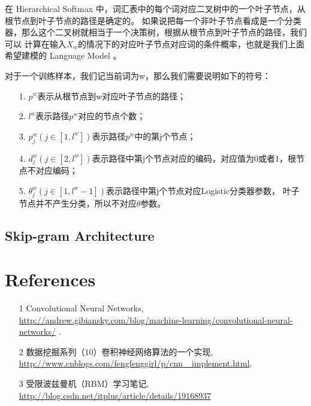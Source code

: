 \documentclass[UTF8]{ctexart}
\begin{document}
\par
在 Hierarchical Softmax 中，词汇表中的每个词对应二叉树中的一个叶子节点，从根节点到叶子节点的路径是确定的。
如果说把每一个非叶子节点看成是一个分类器，那么这个二叉树就相当于一个决策树，根据从根节点到叶子节点的路径，我们可以
计算在输入$X_w$的情况下的对应叶子节点对应词的条件概率，也就是我们上面希望建模的 Language Model 。
\par
对于一个训练样本，我们记当前词为w，那么我们需要说明如下的符号：
\begin{itemize}
\item[1.] $p^w$表示从根节点到w对应叶子节点的路径；
\item[2.] $l^w$表示路径$p^w$对应的节点个数；
\item[3.] $p_j^w(j \in [1, l^w])$表示路径$p^w$中的第j个节点；
\item[4.] $d_j^w(j \in [2, l^w])$表示路径中第j个节点对应的编码，对应值为0或者1，根节点不对应编码；
\item[5.] $\theta_j^w(j \in [1, l^w-1])$表示路径中第j个节点对应Logistic分类器参数，
          叶子节点并不产生分类，所以不对应$\theta$参数。
\end{itemize}

\subsection{Skip-gram Architecture}


\section{References}
\begin{itemize}
\item[1] Convolutional Neural Networks, \\
\url{http://andrew.gibiansky.com/blog/machine-learning/convolutional-neural-networks/} .
\item[2] 数据挖掘系列（10）卷积神经网络算法的一个实现, \\
\url{http://www.cnblogs.com/fengfenggirl/p/cnn\_ implement.html}.
\item[3] 受限波兹曼机（RBM）学习笔记, \\
\url{http://blog.csdn.net/itplus/article/details/19168937}
\end{itemize}
\end{document}
